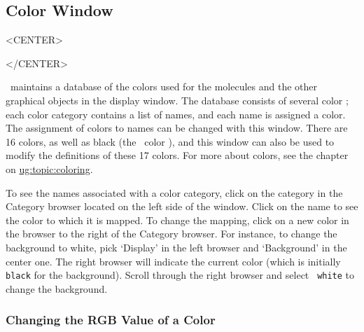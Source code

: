 %
%
%


\subsection{Color Window}
\label{ug:ui:window:color}

\begin{rawhtml}
<CENTER>
\end{rawhtml}
\begin{rawhtml}
</CENTER>
\end{rawhtml}

\VMD\ maintains a database of the colors used for the molecules and the
other graphical objects in the display window.  The database consists
of several color ; each color
category contains a list of names, and each name is assigned a color.
The assignment of colors to names can be changed with this window.
There are 16 colors, as well as black (the \VMD\ color
), and this window can also be used to modify
the definitions of these 17 colors.  For more about colors, see the
chapter on
\hyperref{Coloring}{Coloring [\S }{]}{ug:topic:coloring}.

To see the names associated with a color category, click on the
category in the {\sf Category} browser located on the left side of the
window.  Click on the name to see the color to which it is mapped.  To
change the mapping, click on a new color in the browser to the right
of the {\sf Category} browser.  For instance, to change the
background to white, pick `Display' in the
left browser and `Background' in the center one.  The right browser
will indicate the current color (which is initially {\tt black} for
the background).  Scroll through the right browser and select {\tt
white} to change the background.


\subsubsection{Changing the RGB Value of a Color}

